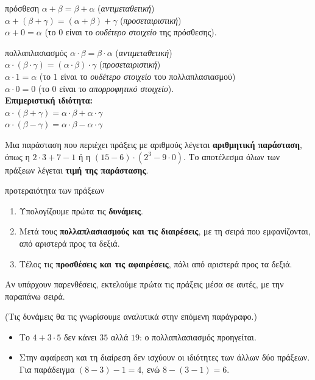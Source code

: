 \begin{idiotita}{πρόσθεση}
$\alpha+\beta=\beta+\alpha$ (\emph{αντιμεταθετική})\\
$\alpha+(\beta+\gamma)=(\alpha+\beta)+\gamma$ (\emph{προσεταιριστική})\\
$\alpha+0=\alpha$ (το $0$ είναι το \emph{ουδέτερο στοιχείο} της πρόσθεσης).
\end{idiotita}

\begin{idiotita}{πολλαπλασιασμός}
$\alpha\cdot\beta=\beta\cdot\alpha$ (\emph{αντιμεταθετική})\\
$\alpha\cdot(\beta\cdot\gamma)=(\alpha\cdot\beta)\cdot\gamma$ (\emph{προσεταιριστική})\\
$\alpha\cdot 1=\alpha$ (το $1$ είναι το \emph{ουδέτερο στοιχείο} του πολλαπλασιασμού)\\
$\alpha\cdot 0=0$ (το $0$ είναι το \emph{απορροφητικό στοιχείο}).\\
\textbf{Επιμεριστική ιδιότητα:}\\
$\alpha\cdot(\beta+\gamma)=\alpha\cdot\beta+\alpha\cdot\gamma$\\
$\alpha\cdot(\beta-\gamma)=\alpha\cdot\beta-\alpha\cdot\gamma$
\end{idiotita}


Μια παράσταση που περιέχει πράξεις με αριθμούς λέγεται \textbf{αριθμητική παράσταση}, όπως η $2\cdot 3+7-1$ ή η $(15-6)\cdot(2^3-9\cdot 0)$. Το αποτέλεσμα όλων των πράξεων λέγεται \textbf{τιμή της παράστασης}.

\begin{kanonas}{προτεραιότητα των πράξεων}
\begin{enumerate}[leftmargin=1.6em,itemsep=0.2ex,topsep=2pt]
\item Υπολογίζουμε πρώτα τις \textbf{δυνάμεις}.
\item Μετά τους \textbf{πολλαπλασιασμούς και τις διαιρέσεις}, με τη σειρά που εμφανίζονται, από αριστερά προς τα δεξιά.
\item Τέλος τις \textbf{προσθέσεις και τις αφαιρέσεις}, πάλι από αριστερά προς τα δεξιά.
\end{enumerate}
Αν υπάρχουν παρενθέσεις, εκτελούμε πρώτα τις πράξεις μέσα σε αυτές, με την παραπάνω σειρά.
\end{kanonas}

(Τις δυνάμεις θα τις γνωρίσουμε αναλυτικά στην επόμενη παράγραφο.)

\begin{prosoxi}
\begin{itemize}[leftmargin=1.2em,itemsep=0.3ex,topsep=2pt]
\item Το $4+3\cdot 5$ δεν κάνει $35$ αλλά $19$: ο πολλαπλασιασμός προηγείται.
\item Στην αφαίρεση και τη διαίρεση δεν ισχύουν οι ιδιότητες των άλλων δύο πράξεων. Για παράδειγμα $(8-3)-1=4$, ενώ $8-(3-1)=6$.
\end{itemize}
\end{prosoxi}

